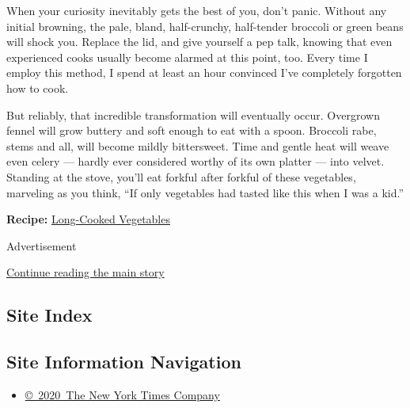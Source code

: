 When your curiosity inevitably gets the best of you, don't panic.
Without any initial browning, the pale, bland, half-crunchy, half-tender
broccoli or green beans will shock you. Replace the lid, and give
yourself a pep talk, knowing that even experienced cooks usually become
alarmed at this point, too. Every time I employ this method, I spend at
least an hour convinced I've completely forgotten how to cook.

But reliably, that incredible transformation will eventually occur.
Overgrown fennel will grow buttery and soft enough to eat with a spoon.
Broccoli rabe, stems and all, will become mildly bittersweet. Time and
gentle heat will weave even celery --- hardly ever considered worthy of
its own platter --- into velvet. Standing at the stove, you'll eat
forkful after forkful of these vegetables, marveling as you think, ``If
only vegetables had tasted like this when I was a kid.''

\textbf{Recipe:}
\href{https://cooking.nytimes3xbfgragh.onion/recipes/1018907-long-cooked-vegetables}{Long-Cooked
Vegetables}

Advertisement

\protect\hyperlink{after-bottom}{Continue reading the main story}

\hypertarget{site-index}{%
\subsection{Site Index}\label{site-index}}

\hypertarget{site-information-navigation}{%
\subsection{Site Information
Navigation}\label{site-information-navigation}}

\begin{itemize}
\tightlist
\item
  \href{https://help.nytimes3xbfgragh.onion/hc/en-us/articles/115014792127-Copyright-notice}{©~2020~The
  New York Times Company}
\end{itemize}

